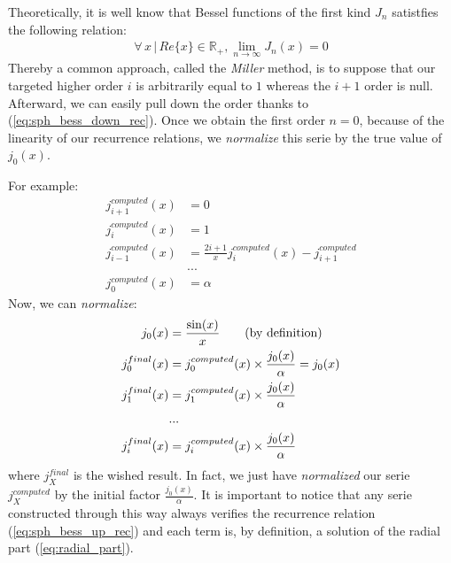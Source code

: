 \documentclass{article}
\numberwithin{equation}{section}
\begin{document}
Theoretically, it is well know that Bessel functions of the first kind $J_{n}$ satistfies the following relation:
\begin{align}
\forall\,x\,|\,Re\{x\} \in\mathbb{R}_{+}, \lim_{n \to \infty } J_{n}(x)=0
\end{align}
Thereby a common approach, called the \textit{Miller} method, is to suppose that our targeted higher order $i$ is arbitrarily equal to $1$ whereas the $i+1$ order is null. Afterward, we can easily pull down the order thanks to (\ref{eq:sph_bess_down_rec}). Once we obtain the first order $n=0$, because of the linearity of our recurrence relations, we \textit{normalize} this serie by the true value of $j_{0}(x)$. 

For example:
\begin{equation}\label{eq:j_computed}
\begin{aligned}
j^{computed}_{i+1}(x) &= 0\\
j^{computed}_{i}(x) &= 1\\
j^{computed}_{i-1}(x) &= \frac{2i+1}{x}j^{computed}_{i}(x) - j^{computed}_{i+1}\\
&...\\
j^{computed}_{0}(x) &= \alpha
\end{aligned}
\end{equation}
Now, we can \textit{normalize}:
\begin{equation}\label{eq:j_final}
\begin{aligned}
j_{0}(x) &= \frac{\sin(x)}{x} \qquad\textnormal{(by definition)}\\
j^{final}_{0}(x) &= j^{computed}_{0}(x) \times \frac{j_{0}(x)}{\alpha} = j_{0}(x)\\
j^{final}_{1}(x) &= j^{computed}_{1}(x) \times \frac{j_{0}(x)}{\alpha}\\
&...\\
j^{final}_{i}(x) &= j^{computed}_{i}(x) \times \frac{j_{0}(x)}{\alpha}\\
\end{aligned}
\end{equation}
where $j^{final}_{X}$ is the wished result. In fact, we just have \textit{normalized} our serie $j^{computed}_{X}$ by the initial factor $\frac{j_{0}(x)}{\alpha}$. It is important to notice that any serie constructed through this way always verifies the recurrence relation (\ref{eq:sph_bess_up_rec}) and each term is, by definition, a solution of the radial part (\ref{eq:radial_part}).
\end{document}
